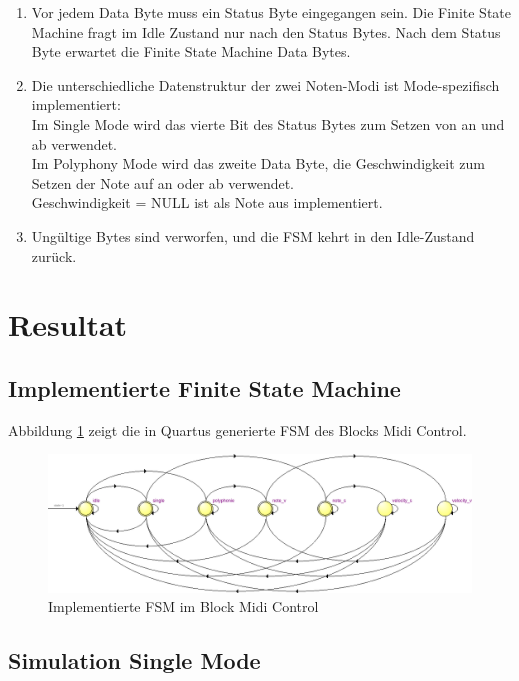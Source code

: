 \begin{enumerate}
	\item Vor jedem Data Byte muss ein Status Byte eingegangen sein. Die Finite State Machine fragt im Idle Zustand nur nach den Status Bytes. 	Nach dem Status Byte erwartet die Finite State Machine Data Bytes. 
	\item Die unterschiedliche Datenstruktur der zwei Noten-Modi ist Mode-spezifisch implementiert:\\
Im Single Mode wird das vierte Bit des Status Bytes zum Setzen von an und ab verwendet.\\
Im Polyphony Mode wird das zweite Data Byte, die Geschwindigkeit zum Setzen der Note auf an oder ab verwendet.\\
Geschwindigkeit = NULL ist als Note aus implementiert.
	\item Ungültige Bytes sind verworfen, und die FSM kehrt in den Idle-Zustand zurück.
\end{enumerate}

\newpage
\section{Resultat}\label{sect.midi_resultat}

\subsection{Implementierte Finite State Machine}

Abbildung \ref{fig.midi_fsm_quartus_} zeigt die in Quartus generierte FSM des Blocks Midi Control.

\begin{figure}[H]
	\includegraphics[width=1\textwidth]{images/midi_control/fsm_midicontrol.png}
	\caption{Implementierte FSM im Block Midi Control}
	\label{fig.midi_fsm_quartus_}
\end{figure}

\subsection{Simulation Single Mode}

